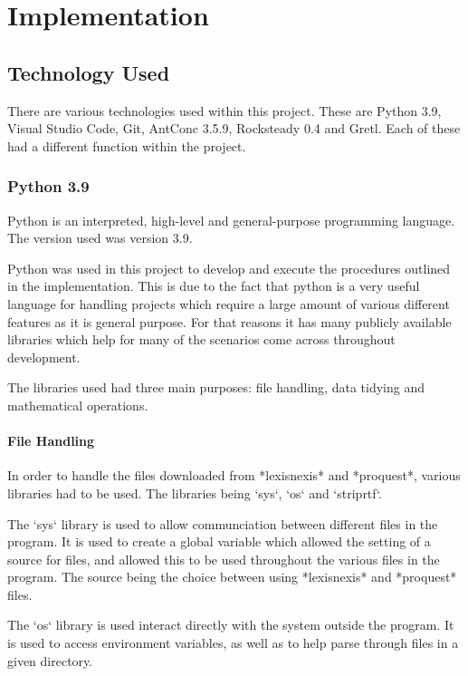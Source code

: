 
\chapter{Implementation}

\section{Technology Used}

There are various technologies used within this project. These are Python 3.9, Visual Studio Code, Git, AntConc 3.5.9, Rocksteady 0.4 and Gretl. Each of these had a different function within the project.

\subsection{Python 3.9}

Python is an interpreted, high-level and general-purpose programming language. The version used was version 3.9. 

Python was used in this project to develop and execute the procedures outlined in the implementation. This is due to the fact that python is a very useful language for handling projects which require a large amount of various different features as it is general purpose. For that reasons it has many publicly available libraries which help for many of the scenarios come across throughout development.

The libraries used had three main purposes: file handling, data tidying and mathematical operations.

\subsubsection{File Handling}

In order to handle the files downloaded from *lexisnexis* and *proquest*, various libraries had to be used. The libraries being `sys`, `os` and `striprtf`.

The `sys` library is used to allow communciation between different files in the program. It is used to create a global variable which allowed the setting of a source for files, and allowed this to be used throughout the various files in the program. The source being the choice between using *lexisnexis* and *proquest* files.

The `os` library is used interact directly with the system outside the program. It is used to access environment variables, as well as to help parse through files in a given directory.

